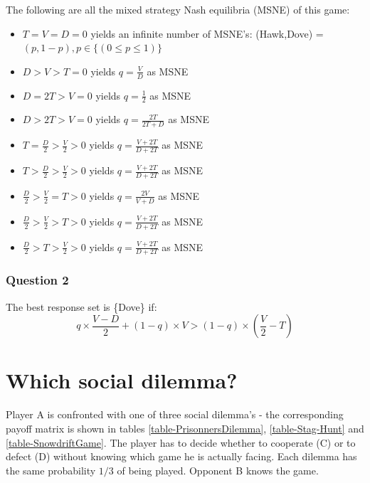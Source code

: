 \documentclass[a4paper, 11pt]{article}
\begin{document}
The following are all the mixed strategy Nash equilibria (MSNE) of this game:
\begin{itemize}[noitemsep]
  \setlength\itemsep{0.5em}
  \item $T=V=D=0$ yields an infinite number of MSNE's: (Hawk,Dove) = $(p,1-p), p \in \{(0\leq p \leq 1) \}$
  \item $D>V>T=0$ yields $q=\frac{V}{D}$ as MSNE
  \item $D=2T>V=0$ yields $q=\frac{1}{2}$ as MSNE
  \item $D>2T>V=0$ yields $q=\frac{2T}{2T+D}$ as MSNE
  \item $T=\frac{D}{2}>\frac{V}{2}>0$ yields $q=\frac{V+2T}{D+2T}$ as MSNE
  \item $T>\frac{D}{2}>\frac{V}{2}>0$ yields $q=\frac{V+2T}{D+2T}$ as MSNE
  \item $\frac{D}{2}>\frac{V}{2}=T>0$ yields $q=\frac{2V}{V+D}$ as MSNE
  \item $\frac{D}{2}>\frac{V}{2}>T>0$ yields $q=\frac{V+2T}{D+2T}$ as MSNE
  \item $\frac{D}{2}>T>\frac{V}{2}>0$ yields $q=\frac{V+2T}{D+2T}$ as MSNE
\end{itemize}

\subsubsection{Question 2}

The best response set is \{Dove\} if:
\[ q \times \frac{V-D}{2} + (1-q) \times V > (1-q) \times ( \frac{V}{2} - T) \]

\newpage
\section{Which social dilemma?}

Player A is confronted with one of three social dilemma's - the corresponding payoff matrix is shown in tables \ref{table-PrisonnersDilemma}, \ref{table-Stag-Hunt} and \ref{table-SnowdriftGame}. The player has to decide whether to cooperate (C) or to defect (D) without knowing which game he is actually facing. Each dilemma has the same probability $1/3$ of being played. Opponent B knows the game.
\end{document}
